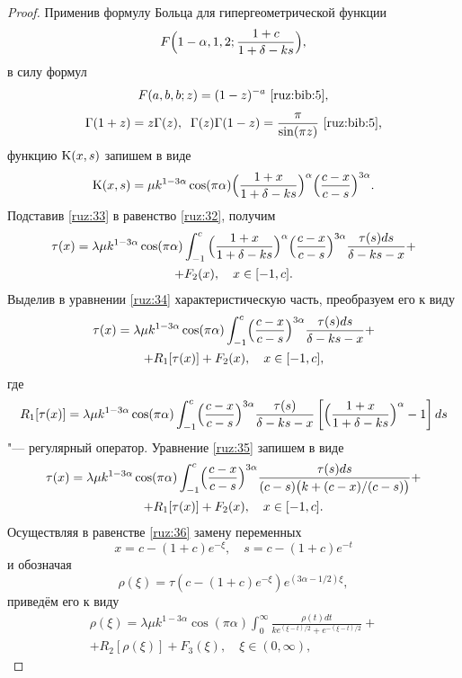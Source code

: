 \begin{proof}
Применив  формулу  Больца  \cite[с.~11]{ruz:bib:5} для гипергеометрической функции
$$F\Bigl(1-\alpha, 1, 2;\frac{1+c}{1+\delta-ks}\Bigr),$$ 
в силу формул 
$$F(a,b,b;z)=(1-z)^{-a}~\text{\cite[с.~13]{ruz:bib:5},}$$
$$
\Gamma(1+z)=z\Gamma(z),\; \; \Gamma(z)\Gamma(1-z)=\frac{\pi}{\sin(\pi z)}~\text{\cite[с.~5]{ruz:bib:5},}$$ функцию ${\rm K}(x,s)$ запишем в виде
\begin{equation}
{\rm K}(x,s)=\mu k^{1-3\alpha}\cos(\pi\alpha)
\Bigl(\frac{1+x}{1+\delta-ks}\Bigr)^\alpha\Bigl(\frac{c-x}{c-s}\Bigr)^{3\alpha}.
\label{ruz:33}
\end{equation}
Подставив \eqref{ruz:33} в равенство \eqref{ruz:32}, получим
\begin{multline}
\tau(x)=\lambda\mu k^{1-3\alpha}\cos(\pi\alpha)\int_{-1}^c{\Bigl(\frac{1+x}{1+\delta-ks}\Bigr)^\alpha
\Bigl(\frac{c-x}{c-s}\Bigr)^{3\alpha}
\frac{\tau(s)ds}{\delta-ks-x}} +\\ +F_2(x),\quad  x\in[-1,c].
\label{ruz:34}
\end{multline}
Выделив в уравнении \eqref{ruz:34}  характеристическую часть, преобразуем его к виду
\begin{multline}
\tau(x)=\lambda\mu k^{1-3\alpha}\cos(\pi\alpha)\int_{-1}^c 
\Bigl(\frac{c-x}{c-s}\Bigr)^{3\alpha}\frac{\tau(s)ds}{\delta-ks-x}+
\\
+R_1[\tau(x)]+F_2(x),\quad x\in[-1, c],
\label{ruz:35}
\end{multline}
где
$$R_1[\tau(x)]=\lambda\mu k^{1-3\alpha}\cos(\pi\alpha)\int_{-1}^c
\Bigl(\frac{c-x}{c-s}\Bigr)^{3\alpha}
\frac{\tau(s)}{\delta-ks-x}\left[\Bigl(\frac{1+x}{1+\delta-ks}\Bigr)^\alpha-1\right]ds$$
"--- регулярный оператор. Уравнение \eqref{ruz:35} запишем в виде
\begin{multline}
\tau(x)=\lambda\mu k^{1-3\alpha}\cos(\pi\alpha)\int_{-1}^c
\Bigl(\frac{c-x}{c-s}\Bigr)^{3\alpha}\frac{\tau(s)ds}{(c-s)
\bigl(k+({c-x})/({c-s})\bigr)}+
\\
+R_1[\tau(x)]+F_2(x),\quad x\in[-1, c].
\label{ruz:36}
\end{multline}
Осуществляя в равенстве \eqref{ruz:36} замену переменных  
$$x=c-(1+c){e^{-\xi}},\quad s=c-(1+c){e^{-t}}$$ и обозначая
$$\rho(\xi)=\tau(c-(1+c){e^{-\xi}}){e^{(3\alpha-1/2)\xi}},$$ 
приведём его к виду
\begin{multline}
\rho(\xi)=\lambda\mu k^{1-3\alpha}\cos(\pi\alpha)\int_0^\infty\frac{\rho(t)dt}{ke^{({\xi-t})/{2}}+e^{-({\xi-t})/{2}}}+
\\
+R_2[\rho(\xi)]+F_3(\xi),\quad \xi\in(0, \infty),
\label{ruz:37}
\end{multline} \pagebreak


\end{proof}
